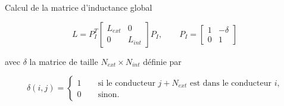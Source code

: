Calcul de la matrice d'inductance global

\Large

\[ L = P_I^T \left[ \begin{array} {cc}
L_{ext} &0 \\
0 & L_{int} \end{array}  \right] P_I , \qquad
P_I=
\left[ \begin{array} {cc}
1 & -\delta \\
0 & 1 \end{array}  \right]
 \]

avec $\delta$ la matrice de taille $N_{ext}\times N_{int}$ définie par

\normalsize
\begin{equation}
\delta(i,j)=
\begin{cases}
1 \qquad \text{si le conducteur $j+N_{ext}$ est dans le conducteur $i$,} \\
0 \qquad \text{sinon.}
\end{cases}
\end{equation}
